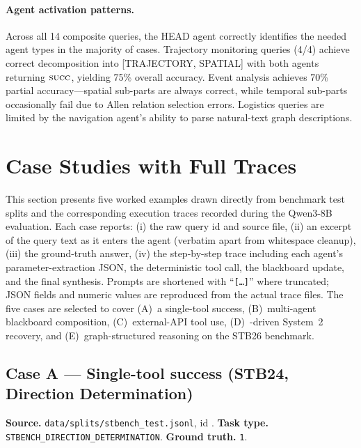 \paragraph{Agent activation patterns.}
Across all 14 composite queries, the HEAD agent correctly identifies the needed agent types in the majority of cases.
Trajectory monitoring queries (4/4) achieve correct decomposition into [TRAJECTORY, SPATIAL] with both agents returning $\textnormal{\textsc{succ}}$, yielding 75\% overall accuracy.
Event analysis achieves 70\% partial accuracy---spatial sub-parts are always correct, while temporal sub-parts occasionally fail due to Allen relation selection errors.
Logistics queries are limited by the navigation agent's ability to parse natural-text graph descriptions.

\FloatBarrier
\section{Case Studies with Full Traces}
\label{app:cases}

This section presents five worked examples drawn directly from benchmark test splits and the corresponding \starname{} execution traces recorded during the Qwen3-8B evaluation.  Each case reports:
(i) the raw query id and source file,
(ii) an excerpt of the query text as it enters the \shead{} agent (verbatim apart from whitespace cleanup),
(iii) the ground-truth answer,
(iv) the step-by-step trace including each agent's parameter-extraction JSON, the deterministic tool call, the blackboard update, and the final \sfuse{} synthesis.
Prompts are shortened with ``\texttt{[\ldots]}'' where truncated; JSON fields and numeric values are reproduced from the actual trace files.
The five cases are selected to cover (A)~a single-tool success, (B)~multi-agent blackboard composition, (C)~external-API tool use, (D)~\smiss-driven System~2 recovery, and (E)~graph-structured reasoning on the STB26 benchmark.

\subsection{Case A --- Single-tool success (STB24, Direction Determination)}
\label{app:case_a}

\textbf{Source.} \texttt{data/splits/stbench\_test.jsonl}, id \texttt{}.
\textbf{Task type.} \texttt{STBENCH\_DIRECTION\_DETERMINATION}.
\textbf{Ground truth.} \texttt{1}.

